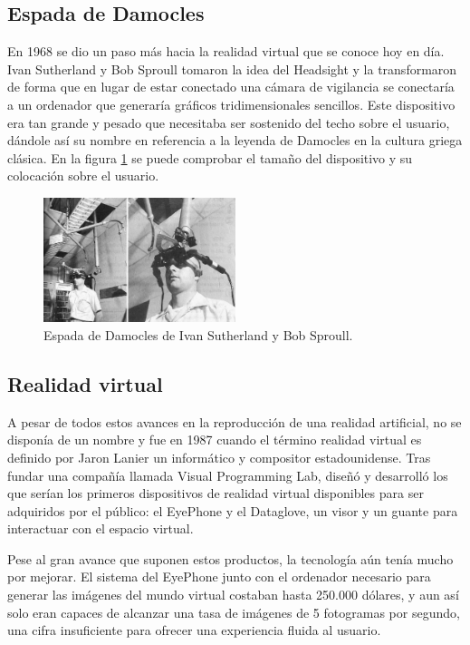 \subsection{Espada de Damocles}

En 1968 se dio un paso más hacia la realidad virtual que se conoce hoy en día. Ivan Sutherland y Bob Sproull tomaron la idea del Headsight y la transformaron de forma que en lugar de estar conectado una cámara de vigilancia se conectaría a un ordenador que generaría gráficos tridimensionales sencillos. Este dispositivo era tan grande y pesado que necesitaba ser sostenido del techo sobre el usuario, dándole así su nombre en referencia a la leyenda de Damocles en la cultura griega clásica. En la figura \ref{fig:EA_damocles} se puede comprobar el tamaño del dispositivo y su colocación sobre el usuario. \cite{EA_vr_damocles}


\begin{figure}[H]
  \centering
\includegraphics[width=0.5\textwidth]{03.EstudioProblema/01.EstadoArte/00.Figuras/16.damocles.jpg}
    \caption{Espada de Damocles de Ivan Sutherland y Bob Sproull. \cite{EA_img_damocles}}
    \label{fig:EA_damocles}
\end{figure}


\subsection{Realidad virtual}

A pesar de todos estos avances en la reproducción de una realidad artificial, no se disponía de un nombre y fue en 1987 cuando el término realidad virtual es definido por Jaron Lanier un informático y compositor estadounidense. Tras fundar una compañía llamada Visual Programming Lab, diseñó y desarrolló los que serían los primeros dispositivos de realidad virtual disponibles para ser adquiridos por el público: el EyePhone y el Dataglove, un visor y un guante para interactuar con el espacio virtual. \cite{EA_vr_lanier}

Pese al gran avance que suponen estos productos, la tecnología aún tenía mucho por mejorar. El sistema del EyePhone junto con el ordenador necesario para generar las imágenes del mundo virtual costaban hasta 250.000 dólares, y aun así solo eran capaces de alcanzar una tasa de imágenes de 5 fotogramas por segundo, una cifra insuficiente para ofrecer una experiencia fluida al usuario. \cite{EA_vr_eyephone}

